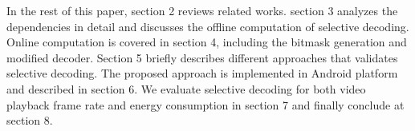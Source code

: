 In the rest of this paper, section 2 reviews related works. section 3 analyzes the dependencies in detail and discusses the offline computation of selective decoding. Online computation is covered in section 4, including the bitmask generation and modified decoder. Section 5 briefly describes different approaches that validates selective decoding. The proposed approach is implemented in Android platform and described in section 6. We evaluate selective decoding for both video playback frame rate and energy consumption in section 7 and finally conclude at section 8. 





  


  
